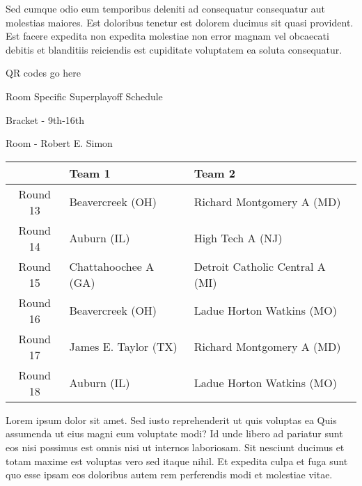 \documentclass{article}%
\begin{document}
\newline%
Sed cumque odio eum temporibus deleniti ad consequatur consequatur aut molestias maiores. Est doloribus tenetur est dolorem ducimus sit quasi provident. Est facere expedita non expedita molestiae non error magnam vel obcaecati debitis et blanditiis reiciendis est cupiditate voluptatem ea soluta consequatur.%
\vspace*{140pt}%
\begin{center}%
\begin{Huge}%
QR codes go here%
\end{Huge}%
\end{center}%
\newpage%
\begin{center}%
\begin{Huge}%
Room Specific Superplayoff Schedule%
\end{Huge}%
\vspace*{8pt}%
\linebreak%
\begin{Large}%
Bracket {-} 9th{-}16th%
\end{Large}%
\vspace*{8pt}%
\linebreak%
\vspace*{8pt}%
\begin{Large}%
Room {-} Robert E. Simon%
\end{Large}%
\end{center}%
%
\begin{tabularx}{\textwidth}{|c|Y|Y|}%
\hline%
&Team 1&Team 2\\%
\hline%
Round 13&Beavercreek (OH)&Richard Montgomery A (MD)\\%
Round 14&Auburn (IL)&High Tech A (NJ)\\%
Round 15&Chattahoochee A (GA)&Detroit Catholic Central A (MI)\\%
Round 16&Beavercreek (OH)&Ladue Horton Watkins (MO)\\%
Round 17&James E. Taylor (TX)&Richard Montgomery A (MD)\\%
Round 18&Auburn (IL)&Ladue Horton Watkins (MO)\\%
\hline%
\end{tabularx}%
\vspace*{8pt}%
\newline%
Lorem ipsum dolor sit amet. Sed iusto reprehenderit ut quis voluptas ea Quis assumenda ut eius magni eum voluptate modi? Id unde libero ad pariatur sunt eos nisi possimus est omnis nisi ut internos laboriosam. Sit nesciunt ducimus et totam maxime est voluptas vero sed itaque nihil. Et expedita culpa et fuga sunt quo esse ipsam eos doloribus autem rem perferendis modi et molestiae vitae.\newline%
\end{document}
